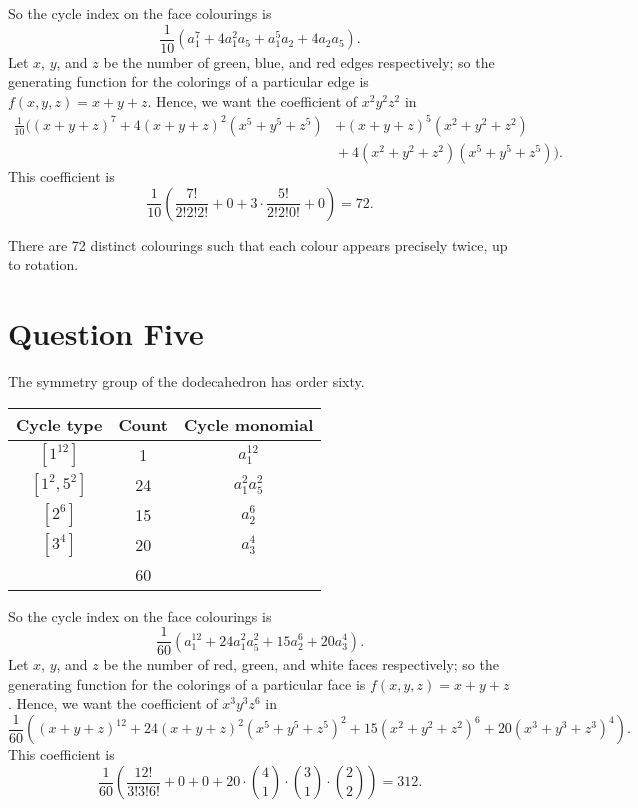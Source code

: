 \documentclass[a4paper,10pt]{amsart}
\begin{document}
So the cycle index on the face colourings is
\begin{displaymath}
  \frac{1}{10}(a_1^7 + 4a_1^2 a_5 + a_1^5 a_2 + 4a_2 a_5).
\end{displaymath}
Let $ x $, $ y $, and $ z $ be the number of green, blue, and red edges respectively; so the generating function for
the colorings of a particular edge is $ f(x,y,z) = x + y + z $. Hence, we want the coefficient of $ x^2 y^2 z^2 $ in
\begin{displaymath}
  \begin{split}
    \frac{1}{10}((x + y + z)^7 + 4(x + y + z)^2 (x^5 + y^5 + z^5) &+ (x + y + z)^5 (x^2 + y^2 + z^2)\\
    &{}+ 4(x^2 + y^2 + z^2)(x^5 + y^5 + z^5)).
  \end{split}
\end{displaymath}
This coefficient is
\begin{displaymath}
  \frac{1}{10}\left(\frac{7!}{2!2!2!} + 0 + 3 \cdot \frac{5!}{2!2!0!} + 0\right) = 72.
\end{displaymath}

There are 72 distinct colourings such that each colour appears precisely twice, up to rotation.

\section*{Question Five}
The symmetry group of the dodecahedron has order sixty.
\begin{center}\begin{tabular}{|c|c|c|}\hline
  \textbf{Cycle type} & \textbf{Count} & \textbf{Cycle monomial}\\\hline
  $ [1^{12}] $ & 1 & $ a_1^{12} $\\
  $ [1^2,5^2] $ & 24 & $ a_1^2a_5^2 $\\
  $ [2^6] $ & 15 & $ a_2^6 $\\
  $ [3^4] $ & 20 & $ a_3^4 $\\\hline
   & 60 &\\\hline
\end{tabular}\end{center}

So the cycle index on the face colourings is
\begin{displaymath}
  \frac{1}{60}(a_1^{12} + 24a_1^2a_5^2 + 15a_2^6 + 20a_3^4).
\end{displaymath}
Let $ x $, $ y $, and $ z $ be the number of red, green, and white faces respectively; so the generating function for
the colorings of a particular face is $ f(x,y,z) = x + y + z $. Hence, we want the coefficient of $ x^3y^3z^6 $ in
\begin{displaymath}
  \frac{1}{60}\left((x+y+z)^{12} + 24(x+y+z)^2(x^5+y^5+z^5)^2 + 15(x^2+y^2+z^2)^6 + 20(x^3+y^3+z^3)^4\right).
\end{displaymath}
This coefficient is
\begin{displaymath}
  \frac{1}{60}\left(\frac{12!}{3!3!6!} + 0 + 0 + 20\cdot\binom{4}{1}\cdot\binom{3}{1}\cdot\binom{2}{2}\right) = 312.
\end{displaymath}
\end{document}
